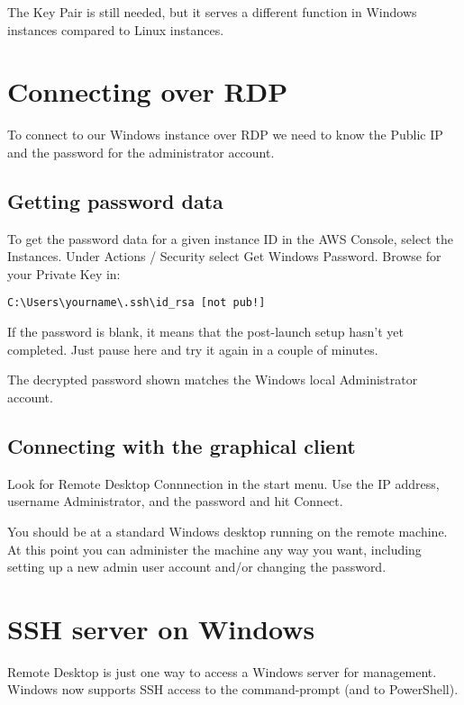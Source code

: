 \documentclass{pgnotes}
\begin{document}
The Key Pair is still needed, but it serves a different function in
Windows instances compared to Linux instances.


\section{Connecting over RDP}\label{connecting-over-rdp}

To connect to our Windows instance over RDP we need to know the Public
IP and the password for the administrator account.

\subsection{Getting password data}\label{getting-password-data}

To get the password data for a given instance ID in the AWS Console, select the Instances.
Under Actions / Security select Get Windows Password.
Browse for your Private Key in:
\begin{verbatim}
C:\Users\yourname\.ssh\id_rsa [not pub!]
\end{verbatim}

If the password is blank, it means that the post-launch setup hasn't yet
completed. Just pause here and try it again in a couple of minutes.

The decrypted password shown matches the Windows local Administrator
account.

\subsection{Connecting with the graphical
client}\label{connecting-with-the-graphical-client}

Look for Remote Desktop Connnection in the start menu. Use the IP
address, username Administrator, and the password and hit Connect.

You should be at a standard Windows desktop running on the remote
machine. At this point you can administer the machine any way you want,
including setting up a new admin user account and/or changing the
password.

\section{SSH server on Windows}\label{ssh-server-on-windows}

Remote Desktop is just one way to access a Windows server for
management. Windows now supports SSH access to the command-prompt (and
to PowerShell).
\end{document}
